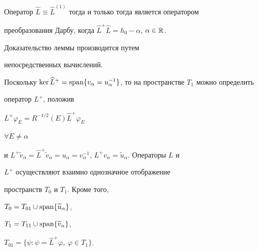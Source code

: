 \begin{lem} Оператор $\widehat{L}\equiv


\widehat{L}^{(1)}$ тогда и только тогда является оператором


преобразования Дарбу, когда $\widehat{L}^{+}\widehat{L}=h_0-


\alpha $, $\alpha \in {\Bbb R} $.


\end{lem}





Доказательство леммы производится путем


непосредственных вычислений.





Поскольку $\ker \widehat{L}^{+}=\Span\{ v_\alpha


=u_\alpha ^{-1}\}$, то на пространстве $T_1$ можно определить


оператор $L^{+}$, положив


$L^{+}\varphi _E=R^{-1/2}(E)\widehat{L}^{+}\varphi _E$


$\forall  E\ne \alpha$


и $L^{+}\widetilde{v}_\alpha


=\widehat{L}^{+}\widetilde{v}_\alpha =u_\alpha =v_\alpha ^{-


1}$, $L^{+}v_\alpha =\widetilde{u}_\alpha $. Операторы $L$ и


$L^{+}$ осуществляют взаимно однозначное отображение


пространств $T_0$ и $T_1$. Кроме того,


$T_0=T_{01}\cup \operatorname{span}\{ \widetilde u_{\alpha}\}$,


$T_1=T_{11} \cup \operatorname{span}\{ \widetilde v_{\alpha}\}$,


$T_{01}=\{\psi :\psi =\widehat{L}^{+}\varphi,\ \varphi \in


T_1\}$.





